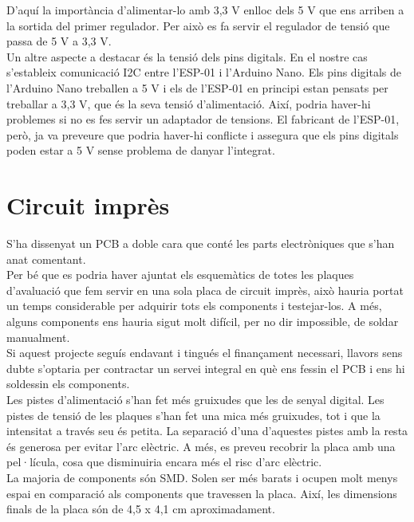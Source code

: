 \noindent D'aquí la importància d'alimentar-lo amb 3,3 V enlloc dels 5 V que ens arriben a la sortida del primer regulador. Per això es fa servir el regulador de tensió que passa de 5 V a 3,3 V.\\
\newline Un altre aspecte a destacar és la tensió dels pins digitals. En el nostre cas s'estableix comunicació I2C entre l'ESP-01 i l'Arduino Nano. Els pins digitals de l'Arduino Nano treballen a 5 V i els de l'ESP-01 en principi estan pensats per treballar a 3,3 V, que és la seva tensió d'alimentació. Així, podria haver-hi problemes si no es fes servir un adaptador de tensions. El fabricant de l'ESP-01, però, ja va preveure que podria haver-hi conflicte i assegura que els pins digitals poden estar a 5 V sense problema de danyar l'integrat.

\section{Circuit imprès}
S'ha dissenyat un PCB a doble cara que conté les parts electròniques que s'han anat comentant.\\
\newline Per bé que es podria haver ajuntat els esquemàtics de totes les plaques d'avaluació que fem servir en una sola placa de circuit imprès, això hauria portat un temps considerable per adquirir tots els components i testejar-los. A més, alguns components ens hauria sigut molt difícil, per no dir impossible, de soldar manualment.\\
\newline Si aquest projecte seguís endavant i tingués el finançament necessari, llavors sens dubte s'optaria per contractar un servei integral en què ens fessin el PCB i ens hi soldessin els components.\\
%
%
%
\newline Les pistes d'alimentació s'han fet més gruixudes que les de senyal digital. Les pistes de tensió de les plaques s'han fet una mica més gruixudes, tot i que la intensitat a través seu és petita. La separació d'una d'aquestes pistes amb la resta és generosa per evitar l'arc elèctric. A més, es preveu recobrir la placa amb una pel·lícula, cosa que disminuiria encara més el risc d'arc elèctric.\\
\newline La majoria de components són SMD. Solen ser més barats i ocupen molt menys espai en comparació als components que travessen la placa. Així, les dimensions finals de la placa són de 4,5 x 4,1 cm aproximadament.\\
